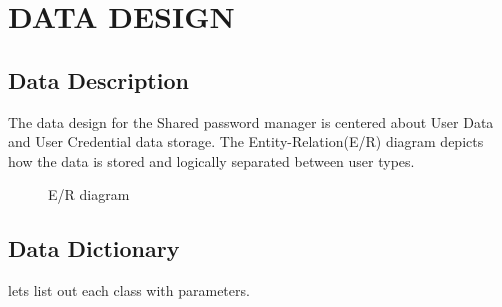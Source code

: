 \documentclass[letterpaper,12pt,oneside,listof=totoc]{scrreprt}
\begin{document}
\chapter{DATA DESIGN}
\section{Data Description}
The data design for the Shared password manager is centered about User Data and User Credential data storage. 
The Entity-Relation(E/R) diagram depicts how the data is stored and logically separated between user types.


\begin{figure}
\centering
{}
\caption{E/R diagram}
\label{arch}
\end{figure}


\section{Data Dictionary}
lets list out each class with parameters.
\end{document}

